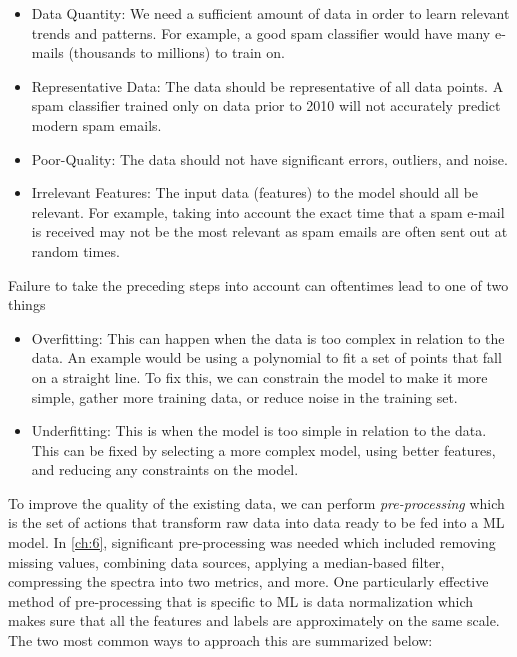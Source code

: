\begin{itemize}
	\item Data Quantity: We need a sufficient amount of data in order to learn relevant trends and patterns. For example, a good spam classifier would have many e-mails (thousands to millions) to train on.
	\item Representative Data: The data should be representative of all data points. A spam classifier trained only on data prior to 2010 will not accurately predict modern spam emails.
	\item Poor-Quality: The data should not have significant errors, outliers, and noise. 
	\item Irrelevant Features: The input data (features) to the model should all be relevant. For example, taking into account the exact time that a spam e-mail is received may not be the most relevant as spam emails are often sent out at random times. 
\end{itemize}
Failure to take the preceding steps into account can oftentimes lead to one of two things

\begin{itemize}
	\item Overfitting: This can happen when the data is too complex in relation to the data. An example would be using a polynomial to fit a set of points that fall on a straight line. To fix this, we can constrain the model to make it more simple, gather more training data, or reduce noise in the training set.
	\item Underfitting: This is when the model is too simple in relation to the data. This can be fixed by selecting a more complex model, using better features, and reducing any constraints on the model.
\end{itemize} 
To improve the quality of the existing data, we can perform \emph{pre-processing} which is the set of actions that transform raw data into data ready to be fed into a \gls{ML} model. In \autoref{ch:6}, significant pre-processing was needed which included removing missing values, combining data sources, applying a median-based filter, compressing the spectra into two metrics, and more. One particularly effective method of pre-processing that is specific to \gls{ML} is data normalization which makes sure that all the features and labels are approximately on the same scale. The two most common ways to approach this are summarized below: 

